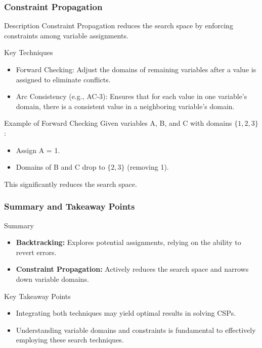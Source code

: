 \documentclass[aspectratio=169]{beamer}
\begin{document}
\begin{frame}[fragile]
    \frametitle{Constraint Propagation}
    \begin{block}{Description}
        Constraint Propagation reduces the search space by enforcing constraints among variable assignments.
    \end{block}
    
    \begin{block}{Key Techniques}
        \begin{itemize}
            \item Forward Checking: Adjust the domains of remaining variables after a value is assigned to eliminate conflicts.
            \item Arc Consistency (e.g., AC-3): Ensures that for each value in one variable's domain, there is a consistent value in a neighboring variable's domain.
        \end{itemize}
    \end{block}

    \begin{block}{Example of Forward Checking}
        Given variables A, B, and C with domains $\{1, 2, 3\}$:
        \begin{itemize}
            \item Assign A = 1.
            \item Domains of B and C drop to $\{2, 3\}$ (removing 1).
        \end{itemize}
        This significantly reduces the search space.
    \end{block}
\end{frame}

\begin{frame}[fragile]
    \frametitle{Summary and Takeaway Points}
    \begin{block}{Summary}
        \begin{itemize}
            \item \textbf{Backtracking:} Explores potential assignments, relying on the ability to revert errors.
            \item \textbf{Constraint Propagation:} Actively reduces the search space and narrows down variable domains.
        \end{itemize}
    \end{block}

    \begin{block}{Key Takeaway Points}
        \begin{itemize}
            \item Integrating both techniques may yield optimal results in solving CSPs.
            \item Understanding variable domains and constraints is fundamental to effectively employing these search techniques.
        \end{itemize}
    \end{block}
\end{frame}
\end{document}
